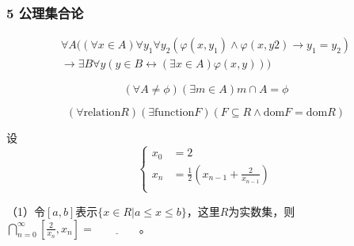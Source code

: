 \documentclass{beamer}
\begin{document}
\begin{CJK*}{UTF8}{gbsn}
\begin{frame}
  \frametitle{5 公理集合论}
    \begin{Ax}[代换公理]
    \begin{equation*}
      \begin{split}
      \forall A ((\forall x \in A) \forall y_1 \forall y_2 (\varphi(x, y_1) \land \varphi(x, y2) \rightarrow y_1 = y_2)\\
      \rightarrow \exists B \forall y (y \in B \leftrightarrow (\exists x \in A) \varphi(x, y)))
    \end{split}
  \end{equation*}
  \end{Ax}
  \begin{Ax}[正则公理]
    \begin{equation*}
      (\forall A \neq \phi) (\exists m \in A) m \cap A = \phi
    \end{equation*}
  \end{Ax}
  \begin{Ax}[选择公理]
    \begin{equation*}
      (\forall \text{relation} R)
      (\exists \text{function} F)
      (F \subseteq R \land
      \text{dom} F
      = \text{dom} R)
    \end{equation*}
  \end{Ax}
\end{frame}
\begin{frame}[t]
  \begin{Exercise}
    设\[
    \begin{cases}
      x_0&=2\\
      x_n&=\frac{1}{2}(x_{n-1}+\frac{2}{x_{n-1}})\\
    \end{cases}
    \]
  
  （1）令$[a,b]$表示$\{x\in R|a\leq x \leq b\}$，这里$R$为实数集，则$\bigcap_{n=0}^{\infty}[\frac{2}{x_n},x_n]=\underline{\quad\quad\quad\quad}$。
  

\end{Exercise}
\end{frame}
\end{CJK*}
\end{document}
